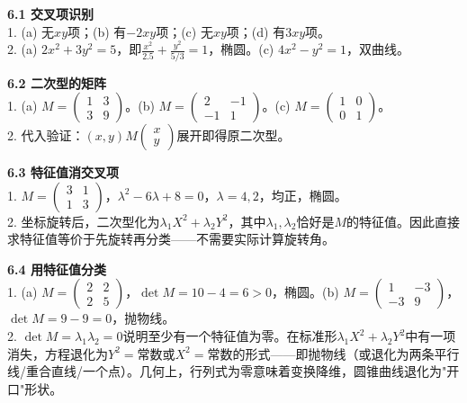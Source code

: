 
\noindent\textbf{6.1 交叉项识别}\\
1. (a) 无$xy$项；(b) 有$-2xy$项；(c) 无$xy$项；(d) 有$3xy$项。\\
2. (a) $2x^2+3y^2=5$，即$\frac{x^2}{2.5}+\frac{y^2}{5/3}=1$，椭圆。(c) $4x^2-y^2=1$，双曲线。

\noindent\textbf{6.2 二次型的矩阵}\\
1. (a) $M=\begin{pmatrix}1&3\\3&9\end{pmatrix}$。(b) $M=\begin{pmatrix}2&-1\\-1&1\end{pmatrix}$。(c) $M=\begin{pmatrix}1&0\\0&1\end{pmatrix}$。\\
2. 代入验证：$(x,y)M\begin{pmatrix}x\\y\end{pmatrix}$展开即得原二次型。

\noindent\textbf{6.3 特征值消交叉项}\\
1. $M=\begin{pmatrix}3&1\\1&3\end{pmatrix}$，$\lambda^2-6\lambda+8=0$，$\lambda=4,2$，均正，椭圆。\\
2. 坐标旋转后，二次型化为$\lambda_1X^2+\lambda_2Y^2$，其中$\lambda_1,\lambda_2$恰好是$M$的特征值。因此直接求特征值等价于先旋转再分类——不需要实际计算旋转角。

\noindent\textbf{6.4 用特征值分类}\\
1. (a) $M=\begin{pmatrix}2&2\\2&5\end{pmatrix}$，$\det M=10-4=6>0$，椭圆。(b) $M=\begin{pmatrix}1&-3\\-3&9\end{pmatrix}$，$\det M=9-9=0$，抛物线。\\
2. $\det M=\lambda_1\lambda_2=0$说明至少有一个特征值为零。在标准形$\lambda_1X^2+\lambda_2Y^2$中有一项消失，方程退化为$Y^2=\text{常数}$或$X^2=\text{常数}$的形式——即抛物线（或退化为两条平行线/重合直线/一个点）。几何上，行列式为零意味着变换降维，圆锥曲线退化为"开口"形状。

